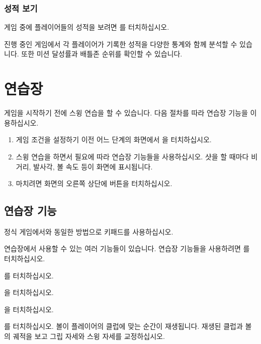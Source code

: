 \documentclass[10pt, openright, language=korean]{hzguide}
\begin{document}
\subsection{성적 보기}
\label{sec:score_card}

게임 중에 플레이어들의 성적을 보려면 를 터치하십시오. 


진행 중인 게임에서 각 플레이어가 기록한 성적을 다양한 통계와 함께 분석할 수 있습니다.
또한 미션 달성률과 배틀존 순위를 확인할 수 있습니다.

\chapter{연습장}
\label{chp:practice_range}

게임을 시작하기 전에 스윙 연습을 할 수 있습니다.
다음 절차를 따라 연습장 기능을 이용하십시오.

\begin{enumerate}
\item 게임 조건을 설정하기 이전 어느 단계의 화면에서 을 터치하십시오.
\item 스윙 연습을 하면서 필요에 따라 연습장 기능들을 사용하십시오.
샷을 할 때마다 비거리, 발사각, 볼 속도 등이 화면에 표시됩니다.
\item 마치려면 화면의 오른쪽 상단에  버튼을 터치하십시오.
\end{enumerate}


\section{연습장 기능}

정식 게임에서와 동일한 방법으로 키패드를 사용하십시오.

연습장에서 사용할 수 있는 여러 기능들이 있습니다. 연습장 기능들을 사용하려면 를 터치하십시오.

를 터치하십시오.

을 터치하십시오.

을 터치하십시오.

를 터치하십시오. 
볼이 플레이어의 클럽에 맞는 순간이 재생됩니다.
재생된 클럽과 볼의 궤적을 보고 그립 자세와 스윙 자세를 교정하십시오.
\end{document}
